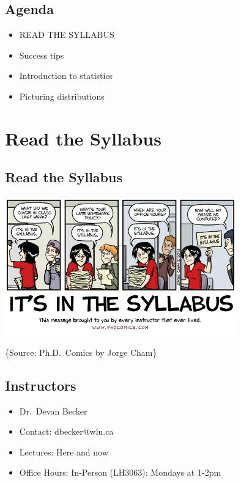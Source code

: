 \documentclass[
  letterpaper,
  DIV=11,
  numbers=noendperiod]{scrreprt}
\providecommand{\tightlist}{%
  \setlength{\itemsep}{0pt}\setlength{\parskip}{0pt}}\usepackage{longtable,booktabs,array}
\begin{document}
\hypertarget{agenda}{%
\section{Agenda}\label{agenda}}

\begin{itemize}
\tightlist
\item
  READ THE SYLLABUS\lspace
\item
  Success tips\lspace
\item
  Introduction to statistics\lspace
\item
  Picturing distributions
\end{itemize}

\hypertarget{read-the-syllabus}{%
\chapter{Read the Syllabus}\label{read-the-syllabus}}

\hypertarget{read-the-syllabus-1}{%
\section{Read the Syllabus}\label{read-the-syllabus-1}}

\centering

\includegraphics[width=0.75\textwidth]{figs/phdSyllabus.png}

\footnotesize\{Source: Ph.D.~Comics by Jorge Cham\}

\raggedright

\hypertarget{instructors}{%
\section{Instructors}\label{instructors}}

\begin{itemize}
\tightlist
\item
  Dr.~Devan Becker
\item
  Contact: dbecker@wlu.ca
\item
  Lectures: Here and now
\item
  Office Hours: In-Person (LH3063): Mondays at 1-2pm
\end{itemize}
\end{document}

